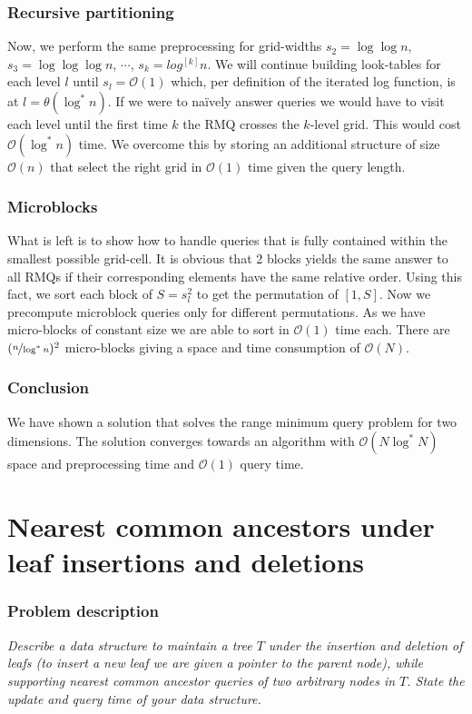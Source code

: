 \documentclass[a4paper,oneside,article,11pt]{memoir}
\begin{document}
\subsection{Recursive partitioning}
Now, we perform the same preprocessing for grid-widths $s_2 = \log \log n$, $s_3 = \log \log \log n$, $\cdots$, $s_k = log^{[k]} n$. We will continue building look-tables for each level $l$ until $s_l = \mathcal{O}(1)$ which, per definition of the iterated log function, is at $l = \theta(\log^* n)$. If we were to naïvely answer queries we would have to visit each level until the first time $k$ the RMQ crosses the $k$-level grid. This would cost $\mathcal{O}(\log^* n)$ time. We overcome this by storing an additional structure of size $\mathcal{O}(n)$ that select the right grid in $\mathcal{O}(1)$ time given the query length.

\subsection{Microblocks}
What is left is to show how to handle queries that is fully contained within the smallest possible grid-cell. It is obvious that 2 blocks yields the same answer to all RMQs if their corresponding elements have the same relative order. Using this fact, we sort each block of $S = s^2_l$ to get the permutation of $[1,S]$. Now we precompute microblock queries only for different permutations. As we have micro-blocks of constant size we are able to sort in $\mathcal{O}(1)$ time each. There are $(\nicefrac{n}{\log^* n})^2$ micro-blocks giving a space and time consumption of $\mathcal{O}(N)$.

\subsection{Conclusion}
We have shown a solution that solves the range minimum query problem for two dimensions. The solution converges towards an algorithm with $\mathcal{O}(N \log^* N)$ space and preprocessing time and $\mathcal{O}(1)$ query time.

\chapter{Nearest common ancestors under leaf insertions and deletions}
\label{chp:LCA}
\subsection{Problem description}
\textit{Describe a data structure to maintain a tree $T$ under the insertion and deletion of leafs (to insert a new leaf we are given a pointer to the parent node), while supporting nearest common ancestor queries of two arbitrary nodes in $T$. State the update and query time of your data structure.}
\end{document}
